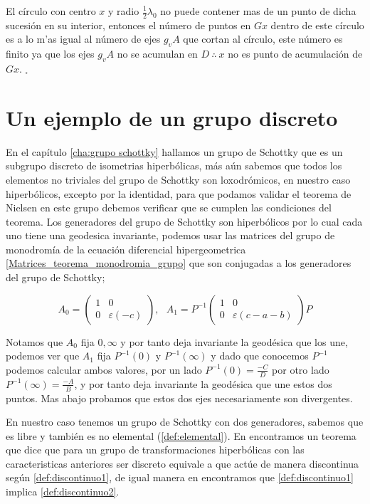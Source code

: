 El c\'irculo con centro $x$ y radio $\frac{1}{2} \lambda_{0}$
no puede contener mas de un punto de dicha sucesi\'on en su
interior, entonces el n\'umero de puntos en $Gx$ dentro de este
c\'irculo es a lo m'as igual al n\'umero de ejes $g_{v}A$ que cortan
al c\'irculo, este n\'umero es finito ya que los ejes $g_{v}A$ no se
acumulan en $D \  \therefore \ x$ no es punto de acumulaci\'on de
$Gx$. $_{\square}$



\section{Un ejemplo de un grupo discreto}

En el cap\'itulo \ref{cha:grupo schottky} hallamos un grupo de Schottky que es un subgrupo discreto de isometrias hiperb\'olicas, m\'as a\'un sabemos que todos los elementos no triviales del grupo de Schottky son loxodr\'omicos, en nuestro caso hiperb\'olicos, excepto por la identidad, para que podamos validar el teorema de Nielsen en este grupo debemos verificar que se cumplen las condiciones del teorema. Los generadores del grupo de Schottky son hiperb\'olicos por lo cual cada uno tiene una geodesica invariante, podemos usar las matrices del grupo de monodrom\'ia de la ecuaci\'on diferencial hipergeometrica \ref{Matrices_teorema_monodromia_grupo} que son conjugadas a los generadores del grupo de Schottky;

$$  A_{0} =  \begin{pmatrix}
 1& 0\\
 0& \varepsilon (-c)
 \end{pmatrix}  ,\ \ \
A_{1} = P ^{-1}\begin{pmatrix}
 1& 0\\
 0& \varepsilon (c-a-b)
 \end{pmatrix} P
$$


Notamos que $A_{0}$ fija $0,\infty$ y por tanto deja invariante la geod\'esica que los une, podemos ver que $A_{1}$ fija $P^{-1}(0)$ y $P^{-1}(\infty)$ y dado que conocemos $P^{-1}$ podemos calcular ambos valores, por un lado $P^{-1}(0)= \frac{-C}{D}$ por otro lado $P^{-1}(\infty) = \frac{-A}{B}$, y por tanto deja invariante la geod\'esica que une estos dos puntos. Mas abajo probamos que estos dos ejes necesariamente son divergentes.

 En nuestro caso tenemos un grupo de Schottky con dos generadores, sabemos que es libre y tambi\'en es no elemental (\ref{def:elemental}). En \cite{Beardon} encontramos un teorema que dice que para un grupo de transformaciones hiperb\'olicas con las caracteristicas anteriores ser discreto equivale a que act\'ue de manera discontinua seg\'un \ref{def:discontinuo1}, de igual manera en \cite{Beardon} encontramos que \ref{def:discontinuo1} implica \ref{def:discontinuo2}.

